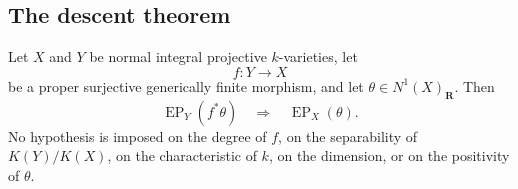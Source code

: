 \subsection{The descent theorem}
\label{sec:ch42-descent-theorem}

\begin{theorem}
\label{thm:ch42-alteration-descent}
Let $X$ and $Y$ be normal integral projective $k$-varieties, let
\[
 f:Y\longrightarrow X
\]
be a proper surjective generically finite morphism, and let
$\theta\in N^1(X)_{\mathbf R}$.  Then
\[
 \operatorname{EP}_Y(f^*\theta)
 \quad\Longrightarrow\quad
 \operatorname{EP}_X(\theta).
\]
No hypothesis is imposed on the degree of $f$, on the separability of
$K(Y)/K(X)$, on the characteristic of $k$, on the dimension, or on the
positivity of $\theta$.
\end{theorem}

